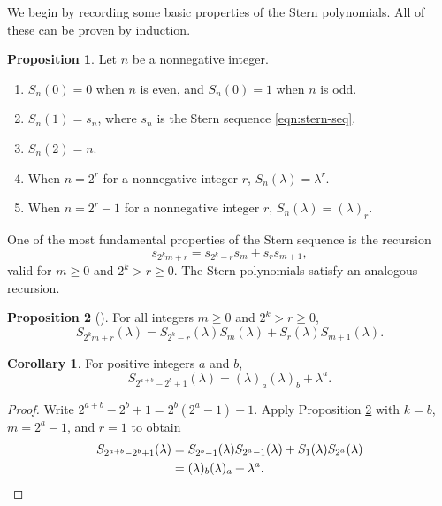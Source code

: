 \documentclass[11pt]{article}
\theoremstyle{definition}
\newtheorem{corr}{Corollary}
\newtheorem{prop}{Proposition}
\newcommand{\stern}[2]{S_{#1}(#2)}
\newcommand{\lm}{\lambda}
\begin{document}
We begin by recording some basic properties of the Stern polynomials.  All of these can be proven by induction.
\begin{prop}\label{prop:basic-patterns}
	Let $n$ be a nonnegative integer.
	
	\vspace{-3pt}
	
	\begin{enumerate}
		\item $\stern{n}{0} = 0$ when $n$ is even, and $\stern n 0 = 1$ when $n$ is odd.
		\item $\stern{n}{1} = s_n$, where $s_n$ is the Stern sequence \eqref{eqn:stern-seq}.
		\item $\stern{n}{2} = n$.
		\item When $n = 2^r$ for a nonnegative integer $r$, $\stern n \lm = \lm^r$.
		\item When $n = 2^r - 1$ for a nonnegative integer $r$, $\stern n\lm = (\lm)_r$.
	\end{enumerate}
\end{prop}

One of the most fundamental properties of the Stern sequence is the recursion
\[
s_{2^km + r} = s_{2^k - r}s_m + s_rs_{m+1},
\]
valid for $m\geq 0$ and $2^k > r \geq 0$.  The Stern polynomials satisfy an analogous recursion.

\begin{prop}[{\cite[Lemma 1]{Schinzel2014}}] \label{prop:important-recursion}
	For all integers $m\geq 0$ and $2^k> r\geq 0$,
	\[
	\stern{2^km+r}\lm = \stern{2^k-r}\lm\stern m\lm + \stern r\lm \stern{m+1}\lm.
	\]
\end{prop}

\begin{corr}\label{cor:special-case-stern}
	For positive integers $a$ and $b$, 
	\[
	\stern{2^{a+b} - 2^b + 1}\lm = (\lm)_a(\lm)_b + \lm^a.
	\]
\end{corr}

\begin{proof}
	Write $2^{a+b} - 2^b + 1 = 2^b(2^a - 1) + 1$.
	Apply Proposition \ref{prop:important-recursion} with $k = b$, $m = 2^a - 1$, and $r = 1$ to obtain
	\begin{align*}
		\stern{2^{a+b} - 2^b + 1}\lm &= \stern{2^b-1}\lm\stern{2^a-1}\lm+\stern 1\lm \stern{2^a}\lm \\
		&= (\lm)_b(\lm)_a + \lm^a.\qedhere
	\end{align*}
\end{proof}
\end{document}
